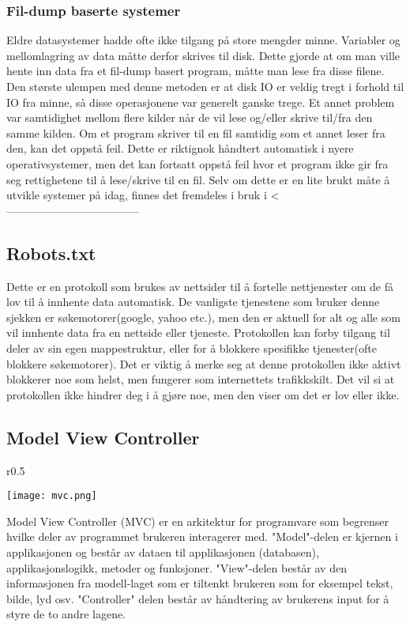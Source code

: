 \documentclass[../main.tex]{subfiles}
\begin{document}
\subsubsection{Fil-dump baserte systemer}

Eldre datasystemer hadde ofte ikke tilgang på store mengder minne. Variabler og mellomlagring av data måtte derfor skrives til disk. Dette gjorde at om man ville hente inn data fra et fil-dump basert program, måtte man lese fra disse filene. Den største ulempen med denne metoden er at disk IO er veldig tregt i forhold til IO fra minne, så disse operasjonene var generelt ganske trege. Et annet problem var samtidighet mellom flere kilder når de vil lese og/eller skrive til/fra den samme kilden. Om et program skriver til en fil samtidig som et annet leser fra den, kan det oppstå feil. Dette er riktignok håndtert automatisk i nyere operativsystemer, men det kan fortsatt oppstå feil hvor et program ikke gir fra seg rettighetene til å lese/skrive til en fil.\newline
Selv om dette er en lite brukt måte å utvikle systemer på idag, finnes det fremdeles i bruk i <------------------------------------

\subsection{Robots.txt}

Dette er en protokoll som brukes av nettsider til å fortelle nettjenester om de få lov til å innhente data automatisk. De vanligste tjenestene som bruker denne sjekken er søkemotorer(google, yahoo etc.), men den er aktuell for alt og alle som vil innhente data fra en nettside eller tjeneste.\newline
Protokollen kan forby tilgang til deler av sin egen mappestruktur, eller for å blokkere spesifikke tjenester(ofte blokkere søkemotorer). Det er viktig å merke seg at denne protokollen ikke aktivt blokkerer noe som helst, men fungerer som internettets trafikkskilt. Det vil si at protokollen ikke hindrer deg i å gjøre noe, men den viser om det er lov eller ikke.

\subsection{Model View Controller}
\begin{wrapfigure}{r}{0.5\textwidth}
  \begin{center}
    \texttt{[image: mvc.png]}
  \end{center}
  \caption{Model View Controller-modellen}
\end{wrapfigure}
Model View Controller (MVC) er en arkitektur for programvare som begrenser hvilke deler av programmet brukeren interagerer med. "Model"-delen er kjernen i applikasjonen og består av dataen til applikasjonen (databasen), applikasjonslogikk, metoder og funksjoner. "View"-delen består av den informasjonen fra modell-laget som er tiltenkt brukeren som for eksempel tekst, bilde, lyd osv. "Controller" delen består av håndtering av brukerens input for å styre de to andre lagene. 
\end{document}
